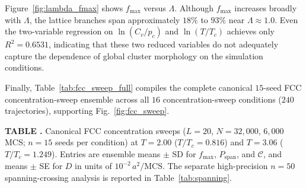 \documentclass[aps,pre,reprint,superscriptaddress,amsmath,amssymb,floatfix]{revtex4-2}
\begin{document}
Figure~\ref{fig:lambda_fmax} shows $f_{\max}$ versus $\Lambda$. Although $f_{\max}$ increases broadly with $\Lambda$, the lattice branches span approximately $18\%$ to $93\%$ near $\Lambda\approx1.0$. Even the two-variable regression on $\ln(C_v/p_c)$ and $\ln(T/T_c)$ achieves only $R^2=0.6531$, indicating that these two reduced variables do not adequately capture the dependence of global cluster morphology on the simulation conditions.

Finally, Table~\ref{tab:fcc_sweep_full} compiles the complete canonical $15$-seed FCC concentration-sweep ensemble across all $16$ concentration-sweep conditions ($240$ trajectories), supporting Fig.~\ref{fig:fcc_sweep}.

\onecolumngrid
{}
\label{tab:fcc_sweep_full}
\noindent\textbf{TABLE \thetable.} Canonical FCC concentration sweeps ($L=20$, $N=32{,}000$, $6{,}000$ MCS; $n=15$ seeds per condition) at $T=2.00$ ($T/T_c=0.816$) and $T=3.06$ ($T/T_c=1.249$). Entries are ensemble means $\pm$ SD for $f_{\max}$, $P_{\mathrm{span}}$, and $\mathcal{C}$, and means $\pm$ SE for $D$ in units of $10^{-2}\,a^2/\mathrm{MCS}$. The separate high-precision $n=50$ spanning-crossing analysis is reported in Table~\ref{tab:spanning}.
\par\vspace{5pt}
\begingroup
\small
\renewcommand{\arraystretch}{1.08}
\setlength{\tabcolsep}{7pt}
\end{document}

